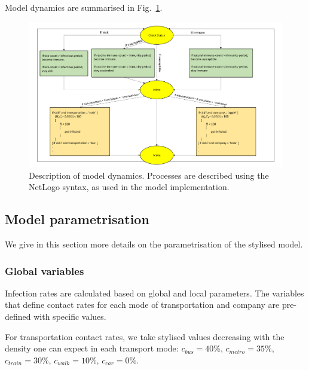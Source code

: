\documentclass[smallextended]{svjour3}       %
\begin{document}
Model dynamics are summarised in Fig.~\ref{fig:modeldyn}.

\begin{figure}
	\centering
	\includegraphics[width=\linewidth]{figures/modelDynamics.png}
	\caption{Description of model dynamics. Processes are described using the NetLogo syntax, as used in the model implementation.\label{fig:modeldyn}}%
\end{figure}


\subsection{Model parametrisation}

We give in this section more details on the parametrisation of the stylised model.




\subsubsection{Global variables}

Infection rates are calculated based on global and local parameters. The variables that define contact rates for each mode of transportation and company are pre-defined with specific values.

For transportation contact rates, we take stylised values decreasing with the density one can expect in each transport mode: $c_{bus} = 40\%$, $c_{metro} = 35\%$, $c_{train} = 30\%$, $c_{walk} = 10\%$, $c_{car} = 0\%$.
\end{document}
